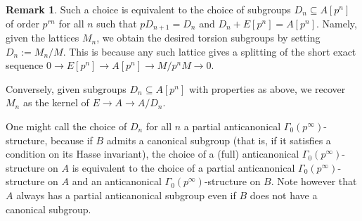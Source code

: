 \documentclass[10pt,oneside]{amsart}
\theoremstyle{definition}
\newtheorem{remark}[theorem]{Remark}
\begin{document}
	\begin{remark}\label{remark: Definition of the D_n}
		Such a choice is equivalent to the choice of subgroups $D_n\subseteq A[p^n]$ of order $p^{rn}$ for all $n$ such that $pD_{n+1}=D_n$ and $D_n+E[p^n]=A[p^n]$. Namely,
		given the lattices $M_{n}$, we obtain the desired torsion subgroups by setting $D_n:=M_{n}/M$. This is because any such lattice gives a splitting of the short exact sequence $0\rightarrow E[p^n]\rightarrow A[p^n]\rightarrow M/p^nM \rightarrow 0$.
		
		Conversely, given subgroups $D_n\subseteq A[p^n]$ with properties as above, we recover $M_n$ as the kernel of $E\rightarrow A\rightarrow A/D_n$.
		
		One might call the choice of $D_n$ for all $n$ a partial anticanonical $\Gamma_0(p^\infty)$-structure, because if $B$ admits a canonical subgroup (that is, if it satisfies a condition on its Hasse invariant), the choice of a (full) anticanonical $\Gamma_0(p^\infty)$-structure on $A$ is equivalent to the choice of a partial anticanonical $\Gamma_0(p^\infty)$-structure on $A$ and an anticanonical $\Gamma_0(p^\infty)$-structure on $B$. Note however that $A$ always has a partial anticanonical subgroup even if $B$ does not have a canonical subgroup.
	\end{remark}
	
\end{document}
